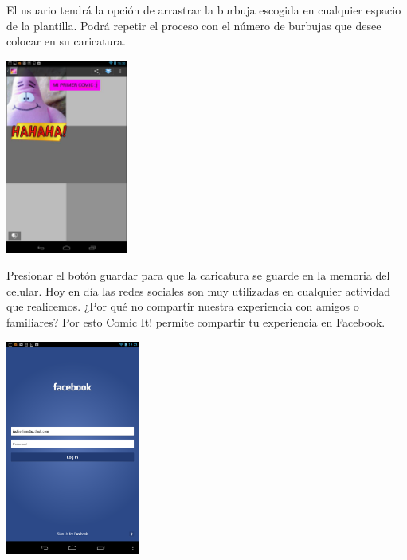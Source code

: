 \documentclass[12pt]{report}
\begin{document}
El usuario tendrá la opción de arrastrar la burbuja escogida en cualquier espacio de la plantilla. Podrá repetir el proceso con el número de burbujas que desee colocar en su caricatura.


	\begin{center}
		\begingroup
			\includegraphics[width=0.30\textwidth]{imagenes_usuario/comic.png}
		\endgroup
	\end{center}

Presionar el botón guardar para que la caricatura se guarde en la memoria del celular.
Hoy en día las redes sociales son muy utilizadas en cualquier actividad que realicemos. ¿Por qué no compartir nuestra experiencia con amigos o familiares?
Por esto Comic It! permite compartir tu experiencia en Facebook.

	\begin{center}
		\begingroup
			\includegraphics[width=0.33\textwidth]{imagenes_usuario/face.png}
		\endgroup
	\end{center}
\end{document}
